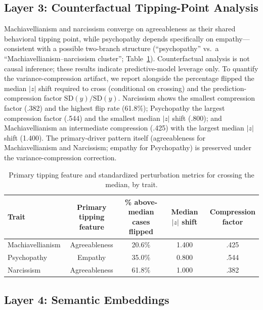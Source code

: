 \documentclass[11pt,twocolumn]{article}
\begin{document}
\subsection{Layer 3: Counterfactual Tipping-Point Analysis}

Machiavellianism and narcissism converge on agreeableness as their shared behavioral tipping point, while psychopathy depends specifically on empathy---consistent with a possible two-branch structure (``psychopathy'' vs.\ a ``Machiavellianism--narcissism cluster''; Table~\ref{tab:counterfactual}). Counterfactual analysis \citep{wachter2017} is not causal inference; these results indicate predictive-model leverage only. To quantify the variance-compression artifact, we report alongside the percentage flipped the median $|z|$ shift required to cross (conditional on crossing) and the prediction-compression factor $\text{SD}(\hat{y}) / \text{SD}(y)$. Narcissism shows the smallest compression factor (.382) and the highest flip rate (61.8\%); Psychopathy the largest compression factor (.544) and the smallest median $|z|$ shift (.800); and Machiavellianism an intermediate compression (.425) with the largest median $|z|$ shift (1.400). The primary-driver pattern itself (agreeableness for Machiavellianism and Narcissism; empathy for Psychopathy) is preserved under the variance-compression correction.

\begin{table}[!t]
\centering
\caption{Primary tipping feature and standardized perturbation metrics for crossing the median, by trait.}
\label{tab:counterfactual}
\footnotesize
\begin{tabular}{lcccc}
\toprule
Trait & \makecell{Primary tipping\\feature} & \makecell{\% above-median\\cases flipped} & \makecell{Median $|z|$\\shift} & \makecell{Compression\\factor} \\
\midrule
Machiavellianism & Agreeableness & 20.6\% & 1.400 & .425 \\
Psychopathy      & Empathy       & 35.0\% & 0.800 & .544 \\
Narcissism       & Agreeableness & 61.8\% & 1.000 & .382 \\
\bottomrule
\end{tabular}
\end{table}

\subsection{Layer 4: Semantic Embeddings}
\label{sec:layer4}
\end{document}
